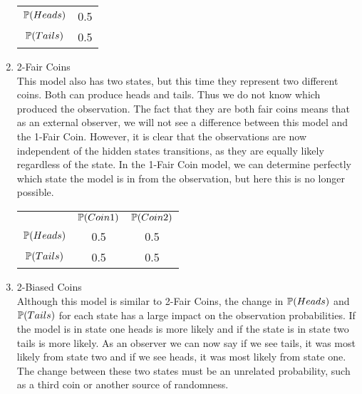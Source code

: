 \begin{example}
\begin{enumerate}
\begin{center}
            \begin{tabular}{c c}
                $\mathbb{P} (Heads)$  & 0.5 \\
                $\mathbb{P} (Tails)$  & 0.5  \\  
            \end{tabular}
        \end{center}
        \item 2-Fair Coins \\ This model also has two states, but this time they represent two different coins. Both can produce heads and tails. Thus we do not know which produced the observation. The fact that they are both fair coins means that as an external observer, we will not see a difference between this model and the 1-Fair Coin. However, it is clear that the observations are now independent of the hidden states transitions, as they are equally likely regardless of the state. In the 1-Fair Coin model, we can determine perfectly which state the model is in from the observation, but here this is no longer possible.
        \begin{center}
    
            \begin{tabular}{c c c}
                & $\mathbb{P} (Coin 1)$ & $\mathbb{P} (Coin 2)$ \\
                $\mathbb{P} (Heads)$  & 0.5   & 0.5 \\
                $\mathbb{P} (Tails)$  & 0.5   & 0.5 \\
            \end{tabular}
        \end{center}
        \item  2-Biased Coins \\ Although this model is similar to 2-Fair Coins, the change in $\mathbb{P} (Heads)$ and $\mathbb{P} (Tails)$ for each state has a large impact on the observation probabilities. If the model is in state one heads is more likely and if the state is in state two tails is more likely. As an observer we can now say if we see tails, it was most likely from state two and if we see heads, it was most likely from state one. The change between these two states must be an unrelated probability, such as a third coin or another source of randomness.
        \begin{center}
\end{center}
\end{enumerate}
\end{example}
